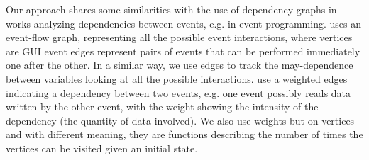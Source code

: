 %
Our approach shares some similarities with the use of dependency graphs in works analyzing dependencies between events, e.g. in event programming. \citet{memon2007event} uses an event-flow graph, representing all the possible event interactions, where vertices are GUI event edges represent pairs of events that can be performed immediately one after the other. In a similar way, we use edges to track the may-dependence between variables looking at all the possible interactions. 
\citet{arlt2012lightweight} use a weighted edges indicating a dependency between two events, e.g. one event possibly reads data written by the other event, with the weight showing the intensity of the dependency (the quantity of data involved). We also use weights but on vertices and with different meaning, they are functions describing the number of times the vertices can be visited given an initial state.
%
%
%

